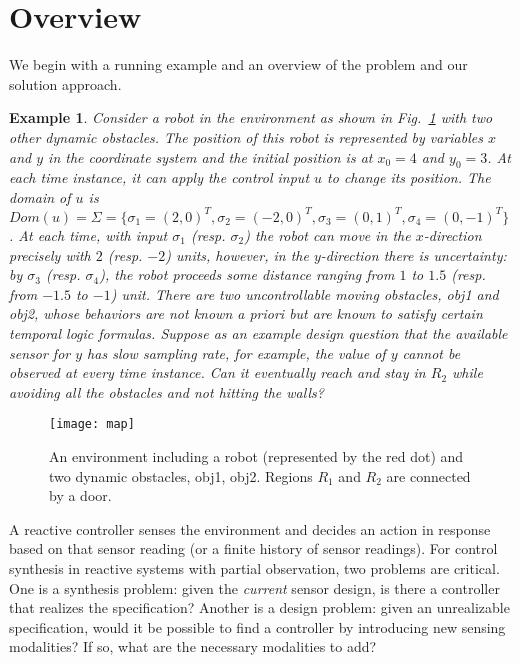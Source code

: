 \documentclass[letterpaper, 10 pt, conference]{ieeeconf}
\newtheorem{example}{Example}
\begin{document}
\section{Overview}
\label{sec:overview}

We begin with a running example and an overview of the problem and our solution approach.

\begin{example}
\label{ex}
Consider a robot in the environment as shown in Fig.~\ref{fig:ex} with
two other dynamic obstacles. The position of this robot is represented
by variables $x$ and $y$ in the coordinate system and the initial
position is at $x_0=4$ and $y_0= 3$. At each time instance, it can
apply the control input $u$ to change its position. The domain of $u$
is $Dom(u)=\Sigma= \{\sigma_1= (2,0)^{T}, \sigma_2= (-2,0)^{T},
\sigma_3= (0,1)^{T}, \sigma_4=(0,-1)^{T}\}$. At each time, with input
$\sigma_1$ (resp. $\sigma_2$) the robot can move in the $x$-direction
precisely with $2$ (resp. $-2$) units, however, in the $y$-direction
there is uncertainty: by $\sigma_3$ (resp. $\sigma_4$), the robot
proceeds some distance ranging from $1$ to $1.5$ (resp. from $-
1.5$ to $-1$) unit.  
There are two uncontrollable moving
obstacles, obj1 and obj2, whose behaviors are not known a priori but are known to
satisfy certain temporal logic formulas. 
Suppose as an
example design question that the available sensor for $y$ has slow
sampling rate, for example, the value of $y$ cannot be observed at
every time instance.
Can it eventually reach and stay in $R_2$ while
avoiding all the obstacles and not hitting the walls?
\end{example}
\begin{figure}[H]
\vspace{-2ex}
  \centering
  \texttt{[image: map]}
  \caption{An environment including a robot (represented by the
    red dot) and two dynamic obstacles, obj1, obj2. Regions $R_1$ and
    $R_2$ are connected by a door.}
  \label{fig:ex}
\end{figure}
\vspace{-2ex}

A reactive controller senses the environment and decides an
action in response based on that
sensor reading (or a finite history of sensor readings).  For control
synthesis in reactive systems with partial observation, two problems
are critical.  One is a synthesis problem: given the \emph{current} sensor
design, is there a controller that realizes the specification?  Another
is a design problem: given an unrealizable specification, would it be
possible to find a controller by introducing new sensing modalities?
If so, what are the necessary modalities to add?
\end{document}
